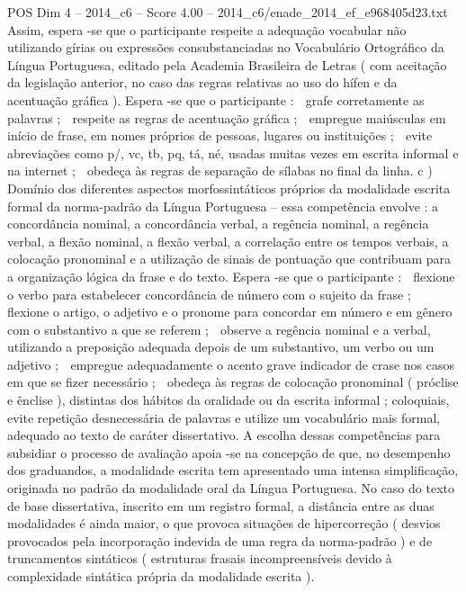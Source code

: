 \begin{textsample}{POS Dim 4 – 2014\_c6 – Score 4.00 – 2014\_c6/enade\_2014\_ef\_e968405d23.txt}
Assim, espera -se que o participante respeite a adequação vocabular não utilizando gírias ou expressões consubstanciadas no Vocabulário Ortográfico da Língua Portuguesa, editado pela Academia Brasileira de Letras ( com aceitação da legislação anterior, no caso das regras relativas ao uso do hífen e da acentuação gráfica ).
Espera -se que o participante :  grafe corretamente as palavras ;  respeite as regras de acentuação gráfica ;  empregue maiúsculas em início de frase, em nomes próprios de pessoas, lugares ou instituições ;  evite abreviações como p/, vc, tb, pq, tá, né, usadas muitas vezes em escrita informal e na internet ;  obedeça às regras de separação de sílabas no final da linha. c ) Domínio dos diferentes aspectos morfossintáticos próprios da modalidade escrita formal da norma-padrão da Língua Portuguesa – essa competência envolve : a concordância nominal, a concordância verbal, a regência nominal, a regência verbal, a flexão nominal, a flexão verbal, a correlação entre os tempos verbais, a colocação pronominal e a utilização de sinais de pontuação que contribuam para a organização lógica da frase e do texto.
Espera -se que o participante :  flexione o verbo para estabelecer concordância de número com o sujeito da frase ;  flexione o artigo, o adjetivo e o pronome para concordar em número e em gênero com o substantivo a que se referem ;  observe a regência nominal e a verbal, utilizando a preposição adequada depois de um substantivo, um verbo ou um adjetivo ;  empregue adequadamente o acento grave indicador de crase nos casos em que se fizer necessário ;  obedeça às regras de colocação pronominal ( próclise e ênclise ), distintas dos hábitos da oralidade ou da escrita informal ; coloquiais, evite repetição desnecessária de palavras e utilize um vocabulário mais formal, adequado ao texto de caráter dissertativo.
A escolha dessas competências para subsidiar o processo de avaliação apoia -se na concepção de que, no desempenho dos graduandos, a modalidade escrita tem apresentado uma intensa simplificação, originada no padrão da modalidade oral da Língua Portuguesa.
No caso do texto de base dissertativa, inscrito em um registro formal, a distância entre as duas modalidades é ainda maior, o que provoca situações de hipercorreção ( desvios provocados pela incorporação indevida de uma regra da norma-padrão ) e de truncamentos sintáticos ( estruturas frasais incompreensíveis devido à complexidade sintática própria da modalidade escrita ).

\end{textsample}
